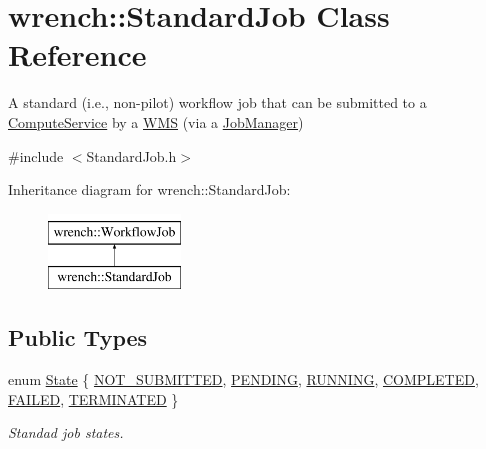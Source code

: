 \hypertarget{classwrench_1_1_standard_job}{}\section{wrench\+:\+:Standard\+Job Class Reference}
\label{classwrench_1_1_standard_job}


A standard (i.\+e., non-\/pilot) workflow job that can be submitted to a \hyperlink{classwrench_1_1_compute_service}{Compute\+Service} by a \hyperlink{classwrench_1_1_w_m_s}{W\+MS} (via a \hyperlink{classwrench_1_1_job_manager}{Job\+Manager})  




{\ttfamily \#include $<$Standard\+Job.\+h$>$}

Inheritance diagram for wrench\+:\+:Standard\+Job\+:\begin{figure}[H]
\begin{center}
\leavevmode
\includegraphics[height=2.000000cm]{classwrench_1_1_standard_job}
\end{center}
\end{figure}
\subsection*{Public Types}
\begin{DoxyCompactItemize}
\item 
enum \hyperlink{classwrench_1_1_standard_job_adad8bdfd5eb774da5be290864ce89c67}{State} \{ \newline
\hyperlink{classwrench_1_1_standard_job_adad8bdfd5eb774da5be290864ce89c67a1dcb6554c663781e960d2797b3ab4259}{N\+O\+T\+\_\+\+S\+U\+B\+M\+I\+T\+T\+ED}, 
\hyperlink{classwrench_1_1_standard_job_adad8bdfd5eb774da5be290864ce89c67a11ce0b60776dc4014022158180021ee8}{P\+E\+N\+D\+I\+NG}, 
\hyperlink{classwrench_1_1_standard_job_adad8bdfd5eb774da5be290864ce89c67a1647a0fb0dfebd8405f1efce1c053ec3}{R\+U\+N\+N\+I\+NG}, 
\hyperlink{classwrench_1_1_standard_job_adad8bdfd5eb774da5be290864ce89c67a8a3100115c3971b11b39a753a3652225}{C\+O\+M\+P\+L\+E\+T\+ED}, 
\newline
\hyperlink{classwrench_1_1_standard_job_adad8bdfd5eb774da5be290864ce89c67add75b1a063433b290f91466dd4b5df31}{F\+A\+I\+L\+ED}, 
\hyperlink{classwrench_1_1_standard_job_adad8bdfd5eb774da5be290864ce89c67a0dc6dd4429f05d26102cc6b749a93349}{T\+E\+R\+M\+I\+N\+A\+T\+ED}
 \}\begin{DoxyCompactList}\small\item\em Standad job states. \end{DoxyCompactList}
\end{DoxyCompactItemize}
